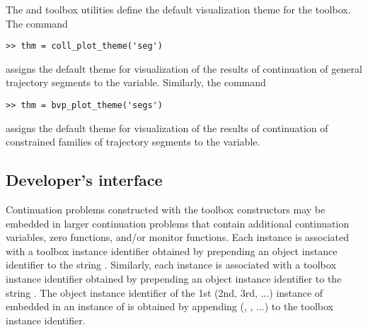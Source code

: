 The  and  toolbox utilities define the default visualization theme for the  toolbox. The command
\begin{lstlisting}[language=coco-highlight]
>> thm = coll_plot_theme('seg')
\end{lstlisting}
assigns the default theme for visualization of the results of continuation of general trajectory segments to the  variable. Similarly, the command
\begin{lstlisting}[language=coco-highlight]
>> thm = bvp_plot_theme('segs')
\end{lstlisting}
assigns the default theme for visualization of the results of continuation of constrained families of trajectory segments to the  variable.


\subsection{Developer's interface}
Continuation problems constructed with the  toolbox constructors may be embedded in larger continuation problems that contain additional continuation variables, zero functions, and/or monitor functions. Each  instance is associated with a toolbox instance identifier obtained by prepending an object instance identifier to the string . Similarly, each  instance is associated with a toolbox instance identifier obtained by prepending an object instance identifier to the string . The object instance identifier of the 1st (2nd, 3rd, ...) instance of  embedded in an instance of  is obtained by appending  (, , ...) to the  toolbox instance identifier.

